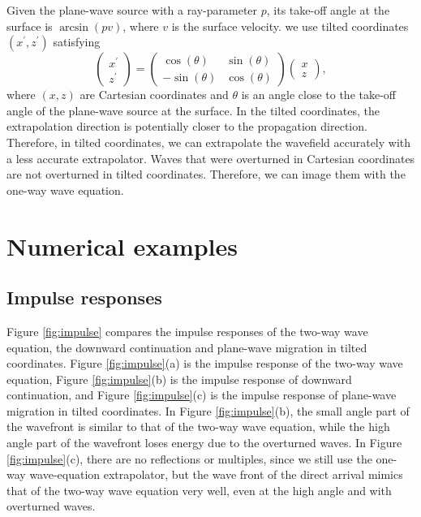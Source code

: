 \par
Given the plane-wave source with a ray-parameter $p$, its take-off angle at the surface is $\arcsin(pv)$, where $v$ is the surface velocity. 
we use tilted coordinates $(x^\prime,z^\prime)$  satisfying
\begin{equation}
\left( 
\begin{array}{l}
x^\prime\\
z^\prime
\end{array}
\right)=
\left(
\begin{array}{cc}
\cos(\theta) & \sin(\theta)\\
-\sin(\theta) & \cos(\theta)
\end{array}
\right)
\left(
\begin{array}{l}
x\\
z
\end{array}
\right),
\end{equation}
where $(x,z)$ are Cartesian coordinates and $\theta$ is an angle close to the take-off angle of the plane-wave 
source at the surface. 
In the tilted coordinates, the extrapolation direction  is potentially closer to the propagation direction.  
Therefore, in tilted coordinates, we can extrapolate the wavefield accurately with a less accurate extrapolator. 
Waves that were overturned in Cartesian coordinates are not overturned in tilted coordinates. 
Therefore, we can image them with the one-way wave equation.

\section{Numerical examples}
\subsection{Impulse responses}
Figure \ref{fig:impulse} compares the impulse responses  of the two-way wave equation, 
the downward continuation and  plane-wave migration in tilted coordinates. 
Figure \ref{fig:impulse}(a) is the impulse response of the two-way wave equation, 
Figure \ref{fig:impulse}(b) is the impulse response of downward continuation, and Figure \ref{fig:impulse}(c) is 
the impulse response of plane-wave migration in tilted coordinates.
In Figure \ref{fig:impulse}(b), the small angle part of the wavefront is similar to
that of the two-way wave equation, while the high angle part of the wavefront 
loses energy due to the overturned waves.
In Figure \ref{fig:impulse}(c), there are no reflections or multiples, since
we still use the one-way wave-equation extrapolator, but the wave front of the direct arrival 
mimics that of the two-way wave equation very well, even
at the high angle and with overturned waves.

